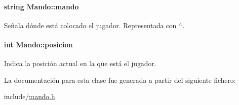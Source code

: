 \paragraph[{\texorpdfstring{mando}{mando}}]{\setlength{\rightskip}{0pt plus 5cm}string Mando\+::mando\hspace{0.3cm}{\ttfamily [private]}}\hypertarget{classMando_a156e71bce6ea523dccbce03021bee4dd}{}\label{classMando_a156e71bce6ea523dccbce03021bee4dd}


Señala dónde está colocado el jugador. Representada con \textquotesingle{}$^\wedge$\textquotesingle{}. 

\paragraph[{\texorpdfstring{posicion}{posicion}}]{\setlength{\rightskip}{0pt plus 5cm}int Mando\+::posicion\hspace{0.3cm}{\ttfamily [private]}}\hypertarget{classMando_a7971a6eaa8b936977be7460ffa28530f}{}\label{classMando_a7971a6eaa8b936977be7460ffa28530f}


Indica la posición actual en la que está el jugador. 



La documentación para esta clase fue generada a partir del siguiente fichero\+:\begin{DoxyCompactItemize}
\item 
include/\hyperlink{mando_8h}{mando.\+h}\end{DoxyCompactItemize}
